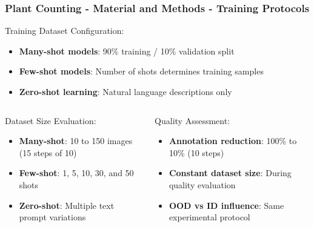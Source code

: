 \documentclass[aspectratio=43]{beamer}
\begin{document}

\begin{frame}
    \frametitle{Plant Counting - Material and Methods - Training Protocols}
    
    \begin{block}{Training Dataset Configuration:}
        \small
        \begin{itemize}
            \item \textbf{Many-shot models}: 90\% training / 10\% validation split
            \item \textbf{Few-shot models}: Number of shots determines training samples
            \item \textbf{Zero-shot learning}: Natural language descriptions only
        \end{itemize}
    \end{block}
    
    \begin{columns}
        \begin{column}{0.5\textwidth}
            \begin{block}{Dataset Size Evaluation:}
                \scriptsize
                \begin{itemize}
                    \item \textbf{Many-shot}: 10 to 150 images (15 steps of 10)
                    \item \textbf{Few-shot}: 1, 5, 10, 30, and 50 shots
                    \item \textbf{Zero-shot}: Multiple text prompt variations
                \end{itemize}
            \end{block}
        \end{column}
        
        \begin{column}{0.5\textwidth}
            \begin{block}{Quality Assessment:}
                \scriptsize
                \begin{itemize}
                    \item \textbf{Annotation reduction}: 100\% to 10\% (10 steps)
                    \item \textbf{Constant dataset size}: During quality evaluation
                    \item \textbf{OOD vs ID influence}: Same experimental protocol
                \end{itemize}
            \end{block}
        \end{column}
    \end{columns}
\end{frame}
\end{document}
